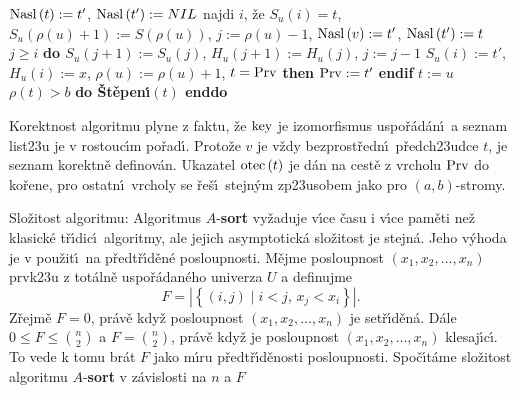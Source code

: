 \phantom{---------}$\operatorname{Nasl}\left(t\right):=t'$, $\operatorname{Nasl}\left(t'\right):=NIL$\newline 
\phantom{------}{\bf else}\newline 
\phantom{---------}najdi $i$, \v ze $S_u\left(i\right)=t$, $S_u\left(\rho\left(u\right)+1\right):=S\left(\rho\left(u\right)\right)$,\newline 
\phantom{---------}$j:=\rho \left(u\right)-1$, $\operatorname{Nasl}\left(v\right):=t'$, $\operatorname{Nasl}\left(t'\right):=t$\newline 
\phantom{---------}{\bf while} $j\ge i$ {\bf do\newline 
\phantom{------------}$S_u\left(j+1\right):=S_u\left(j\right)$}, $H_u\left(j+1\right):=H_u\left(j\right)$, $j:=j-1$\newline 
\phantom{---------}{\bf enddo}\newline 
\phantom{---------}$S_u\left(i\right):=t'$, $H_u\left(i\right):=x$, $\rho \left(u\right):=\rho \left(u\right)+1$,\newline 
\phantom{---------}{\bf if} $t=\operatorname{Prv}$ {\bf then} $\operatorname{Prv}:=t'$ {\bf endif}\newline 
\phantom{------}{\bf endif}\newline 
\phantom{------}$t:=u$\newline 
\phantom{------}{\bf while} $\rho \left(t\right)>b$ {\bf do \v St\v epen\'\i$\left(t\right)$ enddo}\newline 
\phantom{---}{\bf endif\newline 
endif}
\medskip

\flushpar Korektnost algoritmu plyne z faktu, \v ze $\operatorname{key}$ je 
izomorfismus uspo\-\v r\'a\-d\'an\'\i\ a seznam list\accent23u je v 
rostouc\'\i m po\v rad\'\i . Proto\v ze $v$ je v\v zdy bez\-prost\-\v redn\'\i\ 
p\v redch\accent23udce $t$, je seznam korektn\v e definov\'an. 
U\-ka\-zatel $\operatorname{otec}\left(t\right)$ je d\'an na cest\v e z vrcholu $\operatorname{Prv}$ do 
ko\v rene, pro ostatn\'\i\ vrcholy se \v re\v s\'\i\ stejn\'ym 
zp\accent23usobem jako pro $\left(a,b\right)$-stromy.
\medskip

\flushpar Slo\v zitost algoritmu: Algoritmus $A$-{\bf sort} vy\v zaduje v\'\i ce 
\v casu i v\'\i ce pam\v eti ne\v z klasick\'e t\v r\'\i dic\'\i\ algoritmy, ale jejich 
asymptotick\'a slo\v zitost je stejn\'a. Jeho v\'yhoda je v pou\v zit\'\i\ 
na p\v red\-t\v r\'\i\-d\v en\'e posloupnosti. M\v ejme posloupnost $
\left(x_1,x_2,\dots,x_n\right)$ 
prvk\accent23u z to\-t\'aln\v e uspo\v r\'adan\'eho univerza $U$ a definujme 
$$F=|\left\{\left(i,j\right)\mid i<j,\,x_j<x_i\right\}|.$$
Z\v rejm\v e $F=0$, pr\'av\v e kdy\v z posloupnost 
$\left(x_1,x_2,\dots,x_n\right)$ je set\v r\'\i\-d\v en\'a. D\'ale $0\le F\le\binom 
n2$ a $F=\binom n2$, pr\'av\v e 
kdy\v z je posloupnost $\left(x_1,x_2,\dots,x_n\right)$ klesaj\'\i c\'\i . To vede k tomu 
br\'at $F$ jako m\'\i ru p\v redt\v r\'\i d\v enosti posloupnosti. Spo\v c\'\i t\'ame 
slo\v zitost algoritmu $A$-{\bf sort} v z\'avislosti na $n$ a $F$
\medskip

